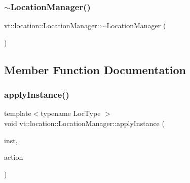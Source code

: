 \subsubsection{\texorpdfstring{$\sim$\+Location\+Manager()}{~LocationManager()}}
{\footnotesize\ttfamily vt\+::location\+::\+Location\+Manager\+::$\sim$\+Location\+Manager (\begin{DoxyParamCaption}{ }\end{DoxyParamCaption})\hspace{0.3cm}{\ttfamily [virtual]}}



\subsection{Member Function Documentation}
\mbox{\label{structvt_1_1location_1_1_location_manager_ae87fb969a0c0e2a45ca3ff15a0f01c00}} 
\subsubsection{\texorpdfstring{apply\+Instance()}{applyInstance()}}
{\footnotesize\ttfamily template$<$typename Loc\+Type $>$ \\
void vt\+::location\+::\+Location\+Manager\+::apply\+Instance (\begin{DoxyParamCaption}\item[{\hyperlink{namespacevt_1_1location_a4db6456e8024af2d23fc5ae560fef866}{Loc\+Inst\+Type} const}]{inst,  }\item[{\hyperlink{structvt_1_1location_1_1_location_manager_a6de3841092c537efc5fb8376128bfe18}{Action\+Loc\+Inst\+Type}$<$ Loc\+Type $>$}]{action }\end{DoxyParamCaption})\hspace{0.3cm}{\ttfamily [static]}}

\mbox{\label{structvt_1_1location_1_1_location_manager_a2d95ed25544679c16a84a173e84b92b6}} 
